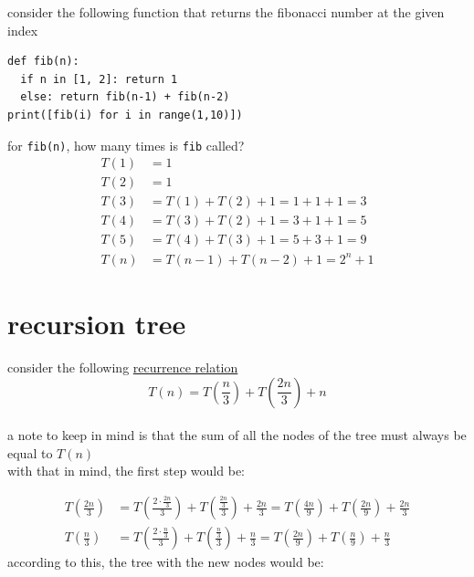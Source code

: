 \documentclass[a4paper,12pt]{article}
\begin{document}
\begin{my_example}
consider the following function that returns the fibonacci number at the given index\\
\lstset{language=Python,label= ,caption= ,captionpos=b,numbers=none}
\begin{lstlisting}
def fib(n):
  if n in [1, 2]: return 1
  else: return fib(n-1) + fib(n-2)
print([fib(i) for i in range(1,10)])
\end{lstlisting}

for \texttt{fib(n)}, how many times is \texttt{fib} called?\\
\begin{align*}
  T(1) &= 1\\
  T(2) &= 1\\
  T(3) &= T(1) + T(2) + 1 = 1 + 1 + 1 = 3\\
  T(4) &= T(3) + T(2) + 1 = 3 + 1 + 1 = 5\\
  T(5) &= T(4) + T(3) + 1 = 5 + 3 + 1 = 9\\
  T(n) &= T(n-1) + T(n-2) + 1 = 2^n + 1
\end{align*}
\end{my_example}
\section{recursion tree}
\label{sec:org555f08a}
\begin{my_example}
consider the following \hyperref[sec:org4c65e1c]{recurrence relation}\\
\[ T(n) = T\left(\frac{n}{3}\right) + T\left(\frac{2n}{3}\right) + n \]\\
a note to keep in mind is that the sum of all the nodes of the tree must always be equal to \(T(n)\)\\
with that in mind, the first step would be:\\
\begin{center}

\end{center}

\begin{align*}
  T\left(\frac{2n}{3}\right) &= T\left(\frac{2 \cdot \frac{2n}{3}}{3}\right) + T\left(\frac{\frac{2n}{3}}{3}\right) + \frac{2n}{3} = T\left(\frac{4n}{9}\right) + T\left(\frac{2n}{9}\right) + \frac{2n}{3}\\
  T\left(\frac{n}{3}\right) &= T\left(\frac{2 \cdot \frac{n}{3}}{3}\right) + T\left(\frac{\frac{n}{3}}{3}\right) + \frac{n}{3} = T\left(\frac{2n}{9}\right) + T\left(\frac{n}{9}\right) + \frac{n}{3}
\end{align*}
according to this, the tree with the new nodes would be:\\
\begin{center}

\end{center}
\end{my_example}
\end{document}
